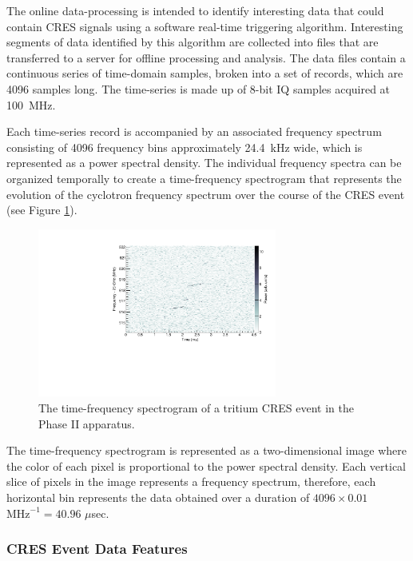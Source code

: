 The online data-processing is intended to identify interesting data that could contain CRES signals using a software real-time triggering algorithm. Interesting segments of data identified by this algorithm are collected into files that are transferred to a server for offline processing and analysis. The data files contain a continuous series of time-domain samples, broken into a set of records, which are 4096 samples long. The time-series is made up of 8-bit IQ samples acquired at 100~MHz. 

Each time-series record is accompanied by an associated frequency spectrum consisting of 4096 frequency bins approximately 24.4~kHz wide, which is represented as a power spectral density. The individual frequency spectra can be organized temporally to create a time-frequency spectrogram that represents the evolution of the cyclotron frequency spectrum over the course of the CRES event (see Figure \ref{fig:chap3-tritium-event0-spectrogram}). 
\begin{figure}[htbp]
    \centering
    \includegraphics[width=0.7\textwidth]{figs/Chapter-3/T2_Event0.pdf}
    \caption{The time-frequency spectrogram of a tritium CRES event in the Phase II apparatus.}
    \label{fig:chap3-tritium-event0-spectrogram}
\end{figure}
The time-frequency spectrogram is represented as a two-dimensional image where the color of each pixel is proportional to the power spectral density. Each vertical slice of pixels in the image represents a frequency spectrum, therefore, each horizontal bin represents the data obtained over a duration of $4096\times 0.01$ $\mathrm{MHz}^{-1}=40.96$ $\mu$sec. 

\subsubsection*{CRES Event Data Features}


